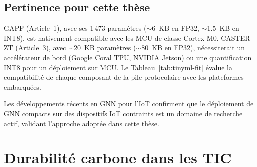 \subsection{Pertinence pour cette thèse}

GAPF (Article~1), avec ses 1\,473 paramètres ($\sim$6~KB en FP32, $\sim$1.5~KB en INT8), est nativement compatible avec les MCU de classe Cortex-M0. CASTER-ZT (Article~3), avec $\sim$20~KB paramètres ($\sim$80~KB en FP32), nécessiterait un accélérateur de bord (Google Coral TPU, NVIDIA Jetson) ou une quantification INT8 pour un déploiement sur MCU. Le Tableau~\ref{tab:tinyml-fit} évalue la compatibilité de chaque composant de la pile protocolaire avec les plateformes embarquées.

\begin{table}[htbp]
\centering
\caption{Compatibilité des composants de la pile protocolaire avec les plateformes embarquées. FP32~: virgule flottante 32 bits. INT8~: entier 8 bits quantifié.}
\label{tab:tinyml-fit}
\end{table}

Les développements récents en GNN pour l'IoT \cite{Nguyen2025GNNIoT} confirment que le déploiement de GNN compacts sur des dispositifs IoT contraints est un domaine de recherche actif, validant l'approche adoptée dans cette thèse.


\section{Durabilité carbone dans les TIC}\label{sec:revlit-carbon}

